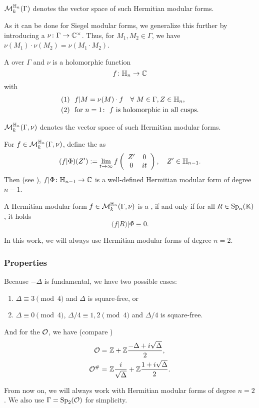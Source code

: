 $\operatorname{\mathcal{M}}^{\mathbb{H}_{n}}_{k} (\Gamma)$
denotes the vector space of such Hermitian modular forms.

As it can be done for Siegel modular forms, we generalize this further by introducing a  $\nu \colon \Gamma \rightarrow \mathbb{C}^\times$. Thus, for $M_1, M_2 \in \Gamma$, we have $\nu(M_1) \cdot \nu(M_2) = \nu(M_1 \cdot M_2)$.

A  over $\Gamma$ and $\nu$
is a holomorphic function
\[ f \colon \mathbb{H}_n \rightarrow \mathbb{C} \]
with
\begin{align*}
(1) \ \ & f | M = \nu(M) \cdot f \quad\forall\ M \in \Gamma, Z \in \mathbb{H}_n , \\
(2) \ \ & \text{for } n = 1 \colon \ \text{$f$ is holomorphic in all cusps} .
\end{align*}

$\operatorname{\mathcal{M}}^{\mathbb{H}_{n}}_{k} (\Gamma,\nu)$
denotes the vector space of such Hermitian modular forms.

For $f \in \operatorname{\mathcal{M}}^{\mathbb{H}_{n}}_{k} (\Gamma,\nu)$, define the  as
\[ (f | \Phi) (Z') := \lim_{t \rightarrow \infty} f\left( \begin{array}{cc}
Z' & 0 \\
0 & it
\end{array}  \right), \quad Z' \in \mathbb{H}_{n-1} . \]
Then (see \cite{Dern01Herm}), $f|\Phi \colon \mathbb{H}_{n-1} \rightarrow \mathbb{C}$ is a well-defined Hermitian modular form of degree $n-1$.

A Hermitian modular form $f \in \operatorname{\mathcal{M}}^{\mathbb{H}_{n}}_{k} (\Gamma,\nu)$ is a , if and only if for all $R \in \operatorname{Sp}_n(\mathbb{K})$, it holds
\[ (f|R) | \Phi \equiv 0 . \]

In this work, we will always use Hermitian modular forms of degree $n=2$.

\subsubsection{Properties}
\label{maxorder}
Because $-\Delta$ is fundamental, we have two possible cases:
\begin{enumerate}
\item $\Delta \equiv 3 \pmod{4}$ and $\Delta$ is square-free, or
\item $\Delta \equiv 0 \pmod{4}$, $\Delta/4 \equiv 1,2 \pmod{4}$ and $\Delta/4$ is square-free.
\end{enumerate}
And for the  $\mathcal{O}$, we have (compare \cite{Dern01Herm})
\begin{align*}
\mathcal{O} = &\ \mathbb{Z} +  \mathbb{Z} \frac{-\Delta+i\sqrt{\Delta}}{2} , \\
\mathcal{O}^\# = & \ \mathbb{Z} \frac{i}{\sqrt{\Delta}} + \mathbb{Z} \frac{1 + i\sqrt{\Delta}}{2} .
\end{align*}

From now on, we will always work with Hermitian modular forms of degree $n=2$. We also use $\Gamma = \operatorname{Sp}_2(\mathcal{O})$ for simplicity.

